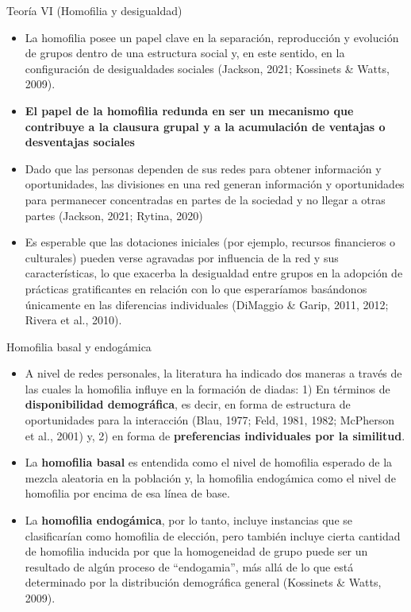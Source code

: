 \documentclass[
  8pt,
  ignorenonframetext,
]{beamer}
\begin{document}
\begin{frame}{Teoría VI (Homofilia y desigualdad)}
\protect\hypertarget{teoruxeda-vi-homofilia-y-desigualdad}{}
\begin{itemize}
\item
  La homofilia posee un papel clave en la separación, reproducción y
  evolución de grupos dentro de una estructura social y, en este
  sentido, en la configuración de desigualdades sociales (Jackson, 2021;
  Kossinets \& Watts, 2009).
\item
  \textbf{El papel de la homofilia redunda en ser un mecanismo que
  contribuye a la clausura grupal y a la acumulación de ventajas o
  desventajas sociales}
\item
  Dado que las personas dependen de sus redes para obtener información y
  oportunidades, las divisiones en una red generan información y
  oportunidades para permanecer concentradas en partes de la sociedad y
  no llegar a otras partes (Jackson, 2021; Rytina, 2020)
\item
  Es esperable que las dotaciones iniciales (por ejemplo, recursos
  financieros o culturales) pueden verse agravadas por influencia de la
  red y sus características, lo que exacerba la desigualdad entre grupos
  en la adopción de prácticas gratificantes en relación con lo que
  esperaríamos basándonos únicamente en las diferencias individuales
  (DiMaggio \& Garip, 2011, 2012; Rivera et al., 2010).
\end{itemize}
\end{frame}

\begin{frame}{Homofilia basal y endogámica}
\protect\hypertarget{homofilia-basal-y-endoguxe1mica}{}
\begin{itemize}
\item
  A nivel de redes personales, la literatura ha indicado dos maneras a
  través de las cuales la homofilia influye en la formación de diadas:
  1) En términos de \textbf{disponibilidad demográfica}, es decir, en
  forma de estructura de oportunidades para la interacción (Blau, 1977;
  Feld, 1981, 1982; McPherson et al., 2001) y, 2) en forma de
  \textbf{preferencias individuales por la similitud}.
\item
  La \textbf{homofilia basal} es entendida como el nivel de homofilia
  esperado de la mezcla aleatoria en la población y, la homofilia
  endogámica como el nivel de homofilia por encima de esa línea de base.
\item
  La \textbf{homofilia endogámica}, por lo tanto, incluye instancias que
  se clasificarían como homofilia de elección, pero también incluye
  cierta cantidad de homofilia inducida por que la homogeneidad de grupo
  puede ser un resultado de algún proceso de ``endogamia'', más allá de
  lo que está determinado por la distribución demográfica general
  (Kossinets \& Watts, 2009).
\end{itemize}
\end{frame}
\end{document}
